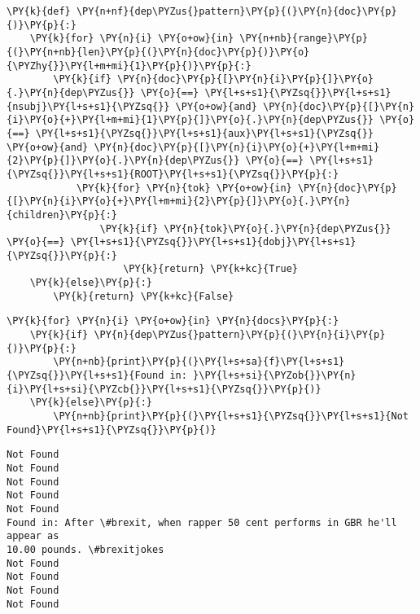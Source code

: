     \begin{tcolorbox}[breakable, size=fbox, boxrule=1pt, pad at break*=1mm,colback=cellbackground, colframe=cellborder]
\begin{Verbatim}[commandchars=\\\{\}]
\PY{k}{def} \PY{n+nf}{dep\PYZus{}pattern}\PY{p}{(}\PY{n}{doc}\PY{p}{)}\PY{p}{:}
    \PY{k}{for} \PY{n}{i} \PY{o+ow}{in} \PY{n+nb}{range}\PY{p}{(}\PY{n+nb}{len}\PY{p}{(}\PY{n}{doc}\PY{p}{)}\PY{o}{\PYZhy{}}\PY{l+m+mi}{1}\PY{p}{)}\PY{p}{:}
        \PY{k}{if} \PY{n}{doc}\PY{p}{[}\PY{n}{i}\PY{p}{]}\PY{o}{.}\PY{n}{dep\PYZus{}} \PY{o}{==} \PY{l+s+s1}{\PYZsq{}}\PY{l+s+s1}{nsubj}\PY{l+s+s1}{\PYZsq{}} \PY{o+ow}{and} \PY{n}{doc}\PY{p}{[}\PY{n}{i}\PY{o}{+}\PY{l+m+mi}{1}\PY{p}{]}\PY{o}{.}\PY{n}{dep\PYZus{}} \PY{o}{==} \PY{l+s+s1}{\PYZsq{}}\PY{l+s+s1}{aux}\PY{l+s+s1}{\PYZsq{}} \PY{o+ow}{and} \PY{n}{doc}\PY{p}{[}\PY{n}{i}\PY{o}{+}\PY{l+m+mi}{2}\PY{p}{]}\PY{o}{.}\PY{n}{dep\PYZus{}} \PY{o}{==} \PY{l+s+s1}{\PYZsq{}}\PY{l+s+s1}{ROOT}\PY{l+s+s1}{\PYZsq{}}\PY{p}{:}
            \PY{k}{for} \PY{n}{tok} \PY{o+ow}{in} \PY{n}{doc}\PY{p}{[}\PY{n}{i}\PY{o}{+}\PY{l+m+mi}{2}\PY{p}{]}\PY{o}{.}\PY{n}{children}\PY{p}{:}
                \PY{k}{if} \PY{n}{tok}\PY{o}{.}\PY{n}{dep\PYZus{}} \PY{o}{==} \PY{l+s+s1}{\PYZsq{}}\PY{l+s+s1}{dobj}\PY{l+s+s1}{\PYZsq{}}\PY{p}{:}
                    \PY{k}{return} \PY{k+kc}{True}
    \PY{k}{else}\PY{p}{:}
        \PY{k}{return} \PY{k+kc}{False}
\end{Verbatim}
\end{tcolorbox}

    \begin{tcolorbox}[breakable, size=fbox, boxrule=1pt, pad at break*=1mm,colback=cellbackground, colframe=cellborder]
\begin{Verbatim}[commandchars=\\\{\}]
\PY{k}{for} \PY{n}{i} \PY{o+ow}{in} \PY{n}{docs}\PY{p}{:}
    \PY{k}{if} \PY{n}{dep\PYZus{}pattern}\PY{p}{(}\PY{n}{i}\PY{p}{)}\PY{p}{:}
        \PY{n+nb}{print}\PY{p}{(}\PY{l+s+sa}{f}\PY{l+s+s1}{\PYZsq{}}\PY{l+s+s1}{Found in: }\PY{l+s+si}{\PYZob{}}\PY{n}{i}\PY{l+s+si}{\PYZcb{}}\PY{l+s+s1}{\PYZsq{}}\PY{p}{)}
    \PY{k}{else}\PY{p}{:}
        \PY{n+nb}{print}\PY{p}{(}\PY{l+s+s1}{\PYZsq{}}\PY{l+s+s1}{Not Found}\PY{l+s+s1}{\PYZsq{}}\PY{p}{)}
\end{Verbatim}
\end{tcolorbox}

    \begin{Verbatim}[commandchars=\\\{\}]
Not Found
Not Found
Not Found
Not Found
Not Found
Found in: After \#brexit, when rapper 50 cent performs in GBR he'll appear as
10.00 pounds. \#brexitjokes
Not Found
Not Found
Not Found
Not Found
    \end{Verbatim}

